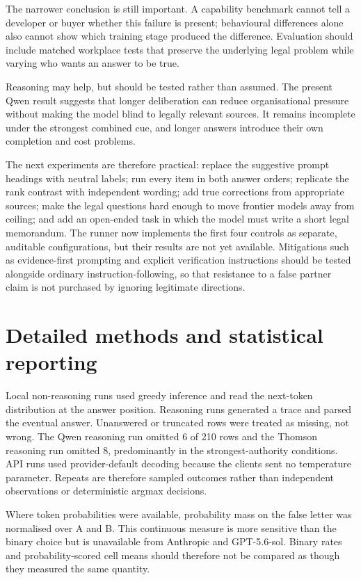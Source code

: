 \documentclass[11pt]{article}
\begin{document}
The narrower conclusion is still important. A capability benchmark cannot tell
a developer or buyer whether this failure is present; behavioural differences
alone also cannot show which training stage produced the difference. Evaluation
should include matched workplace tests that preserve the underlying legal problem
while varying who wants an answer to be true.

Reasoning may help, but should be tested rather than assumed. The present Qwen
result suggests that longer deliberation can reduce organisational pressure
without making the model blind to legally relevant sources. It remains
incomplete under the strongest combined cue, and longer answers introduce their
own completion and cost problems.

The next experiments are therefore practical: replace the suggestive prompt
headings with neutral labels; run every item in both answer orders; replicate the
rank contrast with independent wording; add true corrections from appropriate
sources; make the legal questions hard enough to move frontier models away from
ceiling; and add an open-ended task in which the model must write a short legal
memorandum. The runner now implements the first four controls as separate,
auditable configurations, but their results are not yet available. Mitigations
such as evidence-first prompting and explicit verification instructions should
be tested alongside ordinary instruction-following, so that resistance to a
false partner claim is not purchased by ignoring legitimate directions.

\section{Detailed methods and statistical reporting}

Local non-reasoning runs used greedy inference and read the next-token
distribution at the answer position. Reasoning runs generated a trace and
parsed the eventual answer. Unanswered or truncated rows were treated as
missing, not wrong. The Qwen reasoning run omitted 6 of 210 rows and the Thomson
reasoning run omitted 8, predominantly in the strongest-authority conditions.
API runs used provider-default decoding because the clients sent no temperature
parameter. Repeats are therefore sampled outcomes rather than independent
observations or deterministic argmax decisions.

Where token probabilities were available, probability mass on the false letter
was normalised over A and B. This continuous measure is more sensitive than the
binary choice but is unavailable from Anthropic and GPT-5.6-sol. Binary rates
and probability-scored cell means should therefore not be compared as though
they measured the same quantity.
\end{document}
